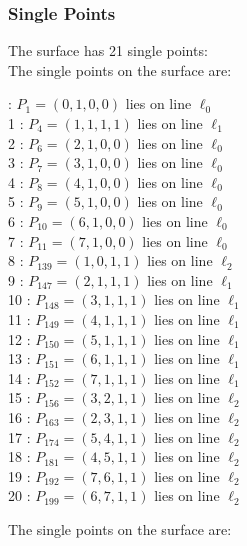 \documentclass{article}
\begin{document}
{\subsubsection*{Single Points}
The surface has 21 single points:\\
The single points on the surface are:\\
\begin{multicols}{2}
 : $P_{1}=( 0, 1, 0, 0 )$ lies on line $\ell_{0}$\\
1 : $P_{4}=( 1, 1, 1, 1 )$ lies on line $\ell_{1}$\\
2 : $P_{6}=( 2, 1, 0, 0 )$ lies on line $\ell_{0}$\\
3 : $P_{7}=( 3, 1, 0, 0 )$ lies on line $\ell_{0}$\\
4 : $P_{8}=( 4, 1, 0, 0 )$ lies on line $\ell_{0}$\\
5 : $P_{9}=( 5, 1, 0, 0 )$ lies on line $\ell_{0}$\\
6 : $P_{10}=( 6, 1, 0, 0 )$ lies on line $\ell_{0}$\\
7 : $P_{11}=( 7, 1, 0, 0 )$ lies on line $\ell_{0}$\\
8 : $P_{139}=( 1, 0, 1, 1 )$ lies on line $\ell_{2}$\\
9 : $P_{147}=( 2, 1, 1, 1 )$ lies on line $\ell_{1}$\\
10 : $P_{148}=( 3, 1, 1, 1 )$ lies on line $\ell_{1}$\\
11 : $P_{149}=( 4, 1, 1, 1 )$ lies on line $\ell_{1}$\\
12 : $P_{150}=( 5, 1, 1, 1 )$ lies on line $\ell_{1}$\\
13 : $P_{151}=( 6, 1, 1, 1 )$ lies on line $\ell_{1}$\\
14 : $P_{152}=( 7, 1, 1, 1 )$ lies on line $\ell_{1}$\\
15 : $P_{156}=( 3, 2, 1, 1 )$ lies on line $\ell_{2}$\\
16 : $P_{163}=( 2, 3, 1, 1 )$ lies on line $\ell_{2}$\\
17 : $P_{174}=( 5, 4, 1, 1 )$ lies on line $\ell_{2}$\\
18 : $P_{181}=( 4, 5, 1, 1 )$ lies on line $\ell_{2}$\\
19 : $P_{192}=( 7, 6, 1, 1 )$ lies on line $\ell_{2}$\\
20 : $P_{199}=( 6, 7, 1, 1 )$ lies on line $\ell_{2}$\\
\end{multicols}
The single points on the surface are:\\
}
\end{document}
